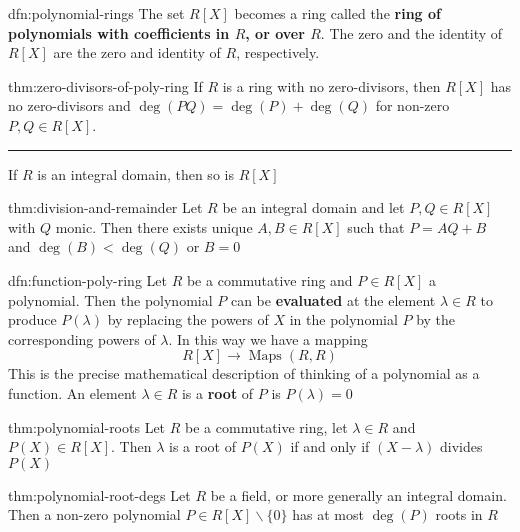 \documentclass[landscape, 8pt]{extarticle}
\DeclareMathOperator{\Maps}{Maps}
\begin{document}
\begin{multicols}{3}
\begin{dfn}{dfn:polynomial-rings}{}
    The set $R[X]$ becomes a ring called the \textbf{ring of polynomials with coefficients in $R$, or over $R$}. The zero and the identity of $R[X]$ are the zero and identity of $R$, respectively.
\end{dfn}


\begin{thm}{thm:zero-divisors-of-poly-ring}{}
    If $R$ is a ring with no zero-divisors, then $R[X]$ has no zero-divisors and $\deg(PQ) = \deg(P) + \deg(Q)$ for non-zero $P,Q\in R[X]$.
    
    \noindent\rule{\textwidth}{0.2pt}
    If $R$ is an integral domain, then so is $R[X]$
\end{thm}

\newpage
\begin{thm}{thm:division-and-remainder}{}
    Let $R$ be an integral domain and let $P, Q\in R[X]$ with $Q$ monic. Then there exists unique $A,B\in R[X]$ such that $P = AQ + B$ and $\deg(B) < \deg(Q)$ or $B = 0$
\end{thm}

\begin{dfn}{dfn:function-poly-ring}{}
    Let $R$ be a commutative ring and $P\in R[X]$ a polynomial. Then the polynomial $P$ can be \textbf{evaluated} at the element $\lambda\in R$ to produce $P(\lambda)$ by replacing the powers of $X$ in the polynomial $P$ by the corresponding powers of $\lambda$. In this way we have a mapping
    \[R[X] \to \Maps(R, R)\]
    This is the precise mathematical description of thinking of a polynomial as a function. An element $\lambda\in R$ is a \textbf{root} of $P$ is $P(\lambda) = 0$
\end{dfn}

\begin{thm}{thm:polynomial-roots}{}
    Let $R$ be a commutative ring, let $\lambda\in R$ and $P(X) \in R[X]$. Then $\lambda$ is a root of $P(X)$ if and only if $(X - \lambda)$ divides $P(X)$
\end{thm}

\begin{thm}{thm:polynomial-root-degs}{}
    Let $R$ be a field, or more generally an integral domain. Then a non-zero polynomial $P\in R[X] \backslash \{0\}$ has at most $\deg(P)$ roots in $R$
\end{thm}


\end{multicols}
\end{document}
